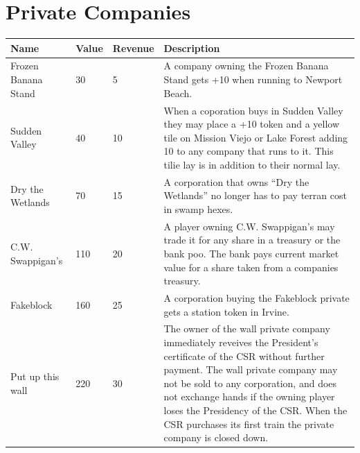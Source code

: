 \documentclass[letterpaper]{article}
\begin{document}
\section{Private Companies}
\begin{tabularx}{\linewidth}{l|l|l|X}
  \hline
  \textbf{Name} & \textbf{Value} & \textbf{Revenue} & \textbf{Description} \\
  \hline
  \hline
  Frozen Banana Stand & 30 & 5 & A company owning the Frozen Banana Stand gets +10 when running to Newport Beach. \\
  \hline
  Sudden Valley & 40 & 10 & When a coporation buys in Sudden Valley they may place a +10 token and a yellow tile on Mission Viejo or Lake Forest adding 10 to any company that runs to it. This tilie lay is in addition to their normal lay. \\
  \hline
  Dry the Wetlands & 70 & 15 & A corporation that owns ``Dry the Wetlands'' no longer has to pay terran cost in swamp hexes. \\
  \hline
  C.W. Swappigan's & 110 & 20 & A player owning C.W. Swappigan's may trade it for any share in a treasury or the bank poo. The bank pays current market value for a share taken from a companies treasury. \\
  \hline
  Fakeblock & 160 & 25 & A corporation buying the Fakeblock private gets a station token in Irvine. \\
  \hline
  Put up this wall & 220 & 30 & The owner of the wall private company immediately reveives the President's certificate of the CSR without further payment. The wall private company may not be sold to any corporation, and does not exchange hands if the owning player loses the Presidency of the CSR. When the CSR purchases its first train the private company is closed down. \\
  \hline
\end{tabularx}
\end{document}
